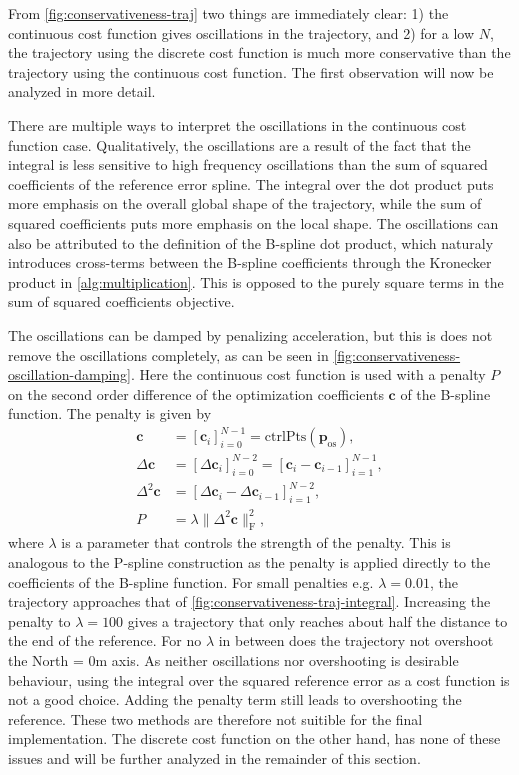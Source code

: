 From \cref{fig:conservativeness-traj} two things are immediately clear: 1) 
the continuous cost function gives oscillations in the trajectory, 
and 2) 
for a low $N$, the trajectory using the discrete cost function is much more conservative than the trajectory using the continuous cost function. The first observation will now be analyzed in more detail. 

There are multiple ways to interpret the oscillations in the continuous cost function case. Qualitatively, the oscillations are a result of the fact that the integral is less sensitive to high frequency oscillations than the sum of squared coefficients of the reference error spline. The integral over the dot product puts more emphasis on the overall global shape of the trajectory, while the sum of squared coefficients puts more emphasis on the local shape. The oscillations can also be attributed to the definition of the B-spline dot product, which naturaly introduces cross-terms between the B-spline coefficients through the Kronecker product in \cref{alg:multiplication}. This is opposed to the purely square terms in the sum of squared coefficients objective.

The oscillations can be damped by penalizing acceleration, but this is does not remove the oscillations completely, as can be seen in \cref{fig:conservativeness-oscillation-damping}. Here the continuous cost function is used with a penalty $P$ on the second order difference of the optimization coefficients $\mathbf c$ of the B-spline function. The penalty is given by
\begin{equation}\label{eq:conservativeness-oscillation-damping}
    \begin{aligned}
        \mathbf c &= [\mathbf c_i]_{i=0}^{N-1} =
        \text{ctrlPts}\left(\mathbf{p}_\text{os}\right), \\
        \Delta \mathbf c &= [\Delta\mathbf c_i]_{i=0}^{N-2} =
        [\mathbf c_i - \mathbf c_{i-1}]_{i=1}^{N-1}, \\
        \Delta^2 \mathbf c &= [\Delta \mathbf c_i - \Delta \mathbf c_{i-1}]_{i=1}^{N-2}, \\
        P &= \lambda \|\Delta^2 \mathbf c\|_\text{F}^2,
    \end{aligned}
\end{equation}
where $\lambda$ is a parameter that controls the strength of the penalty. This is analogous to the P-spline construction \citep{Eilers1996} as the penalty is applied directly to the coefficients of the B-spline function. For small penalties e.g. $\lambda=0.01$, the trajectory approaches that of \cref{fig:conservativeness-traj-integral}. Increasing the penalty to $\lambda=100$ gives a trajectory that only reaches about half the distance to the end of the reference. For no $\lambda$ in between does the trajectory not overshoot the North = 0m axis. As neither oscillations nor overshooting is desirable behaviour, using the integral over the squared reference error as a cost function is not a good choice. Adding the penalty term still leads to overshooting the reference. These two methods are therefore not suitible for the final implementation. The discrete cost function on the other hand, has none of these issues and will be further analyzed in the remainder of this section. 

